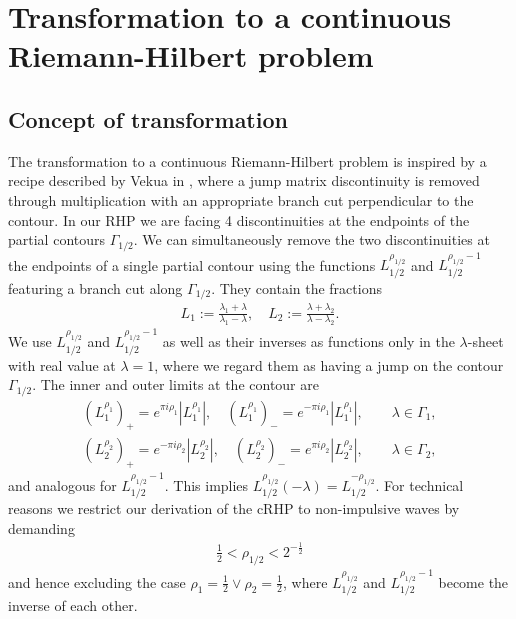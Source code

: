 \documentclass[12pt]{iopart}
\begin{document}
\section{Transformation to a continuous Riemann-Hilbert problem}

\subsection{Concept of transformation}

The transformation to a continuous Riemann-Hilbert problem is inspired by a recipe described by Vekua in \cite{Vekua1967}, where a jump matrix discontinuity is removed through multiplication with an appropriate branch cut perpendicular to the contour. In our RHP we are facing 4 discontinuities at the endpoints of the partial contours $\Gamma_{1/2}$. We can simultaneously remove the two discontinuities at the endpoints of a single partial contour using the functions $L_{1/2}^{\rho_{1/2}}$ and $L_{1/2}^{\rho_{1/2}-1}$ featuring a branch cut along $\Gamma_{1/2}$. They contain the fractions
\begin{eqnarray}
L_1:=\frac{\lambda_1+\lambda}{\lambda_1-\lambda},\quad 
L_2:=\frac{\lambda+\lambda_2}{\lambda-\lambda_2}.
\end{eqnarray}
We use $L_{1/2}^{\rho_{1/2}}$ and $L_{1/2}^{\rho_{1/2}-1}$ as well as their inverses as functions only in the $\lambda$-sheet with real value at $\lambda=1$, where we regard them as having a jump on the contour $\Gamma_{1/2}$. The inner and outer limits at the contour are
\begin{eqnarray}
(L_1^{\rho_1})_+=e^{\pi i \rho_1}|L_1^{\rho_1}|, \quad (L_1^{\rho_1})_-=e^{-\pi i \rho_1}|L_1^{\rho_1}|, \quad\quad
\lambda\in\Gamma_1,\label{L1innenAussen} \\
(L_2^{\rho_2})_+=e^{-\pi i \rho_2}|L_2^{\rho_2}|, \quad (L_2^{\rho_2})_-=e^{\pi i \rho_2}|L_2^{\rho_2}|, \quad\quad
\lambda\in\Gamma_2,\label{L2innenAussen} 
\end{eqnarray}
and analogous for $L_{1/2}^{\rho_{1/2}-1}$. This implies $L_{1/2}^{\rho_{1/2}}(-\lambda)=L_{1/2}^{-\rho_{1/2}}$. For technical reasons we restrict our derivation of the cRHP to non-impulsive waves by demanding
\begin{eqnarray} \label{rhoGrenze2}
\mbox{$\frac12$}<\rho_{1/2}<2^{-\frac12}
\end{eqnarray}
and hence excluding the case $\rho_1=\frac12\vee\rho_2=\frac12$, where $L_{1/2}^{\rho_{1/2}}$ and $L_{1/2}^{\rho_{1/2}-1}$ become the inverse of each other. 
\end{document}
